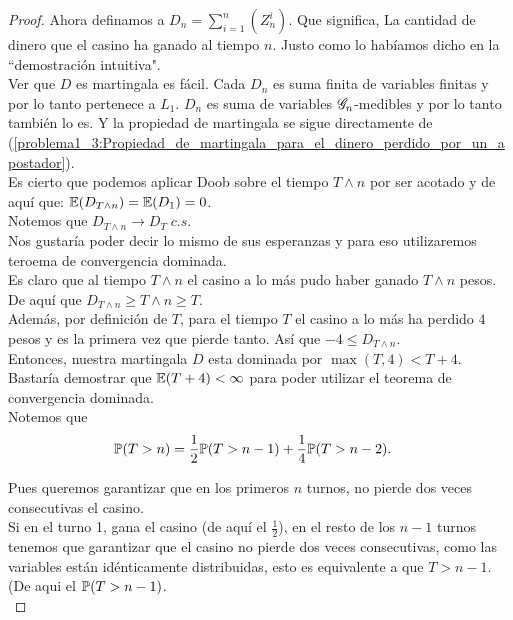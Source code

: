 \begin{proof}
		Ahora definamos a ${D_n = \sum_{i=1}^n (Z_n^i)}$. Que significa, La cantidad de dinero que el casino ha ganado al tiempo ${n}$. 
		Justo como lo habíamos dicho en la ``demostración intuitiva".\\
		
		Ver que ${D}$ es martingala es fácil. Cada ${D_n}$ es suma finita de variables finitas y por lo tanto pertenece a ${L_1}$.
		${D_n}$ es suma de variables ${\mathscr{G}_n}$-medibles y por lo tanto también lo es. Y la propiedad de martingala se sigue directamente de
		(\ref{problema1_3:Propiedad_de_martingala_para_el_dinero_perdido_por_un_apostador}).\\
		
		Es cierto que podemos aplicar Doob sobre el tiempo ${T \wedge n}$ por ser acotado y de aquí que:
		${\mathbb{E}(D_{T \wedge n}) = \mathbb{E}(D_1) = 0}$.\\
		
		Notemos que ${D_{T \wedge n} \longrightarrow D_T \; c.s.}$\\
		
		Nos gustaría poder decir lo mismo de sus esperanzas y para eso utilizaremos teroema de convergencia dominada.\\
		
		Es claro que al tiempo ${T \wedge n}$ el casino a lo más pudo haber ganado ${T \wedge n}$ pesos.
		De aquí que ${D_{T \wedge n} \geq T \wedge n \geq T}$.\\
		
		Además, por definición de ${T}$, para el tiempo ${T}$ el casino a lo más ha perdido ${4}$ pesos y es la primera vez que 
		pierde tanto. Así que ${-4 \leq D_{T \wedge n}}$.\\ 
		
		Entonces, nuestra martingala ${D}$ esta dominada por ${\max(T, 4) < T + 4}$. Bastaría demostrar que ${\mathbb{E}(T+4) < \infty}$ para poder
		utilizar el teorema de convergencia dominada.\\
		
		Notemos que 
		\begin{align}\label{problema1_3:Acotando_T}
			\mathbb{P}(T > n) &= \frac{1}{2} \mathbb{P}(T > n-1) + \frac{1}{4} \mathbb{P}(T > n-2). 
		\end{align}
		
		Pues queremos garantizar que en los primeros ${n}$ turnos, no pierde dos veces consecutivas el casino.\\
		
		Si en el turno 1, gana el casino (de aquí el ${\frac{1}{2}}$), en el resto de los ${n-1}$ turnos tenemos que garantizar que 
		el casino no pierde dos veces consecutivas, como las variables están idénticamente distribuidas, esto es equivalente a que
		${T>n-1}$. (De aqui el ${\mathbb{P}(T > n-1)}$.\\
		

\end{proof}
